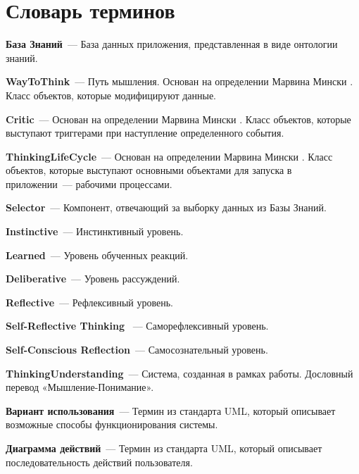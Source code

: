 \chapter*{Словарь терминов} \label{Glossary}            %

\textbf{База Знаний}~--- База данных приложения, представленная в виде онтологии знаний. \par
\textbf{WayToThink}~--- Путь мышления. Основан на определении Марвина Мински \cite{EmotionMachine}. Класс объектов, которые модифицируют данные. \par
\textbf{Critic}~--- Основан на определении Марвина Мински \cite{EmotionMachine}. Класс объектов, которые выступают триггерами при наступление определенного события. \par
\textbf{ThinkingLifeCycle}~--- Основан на определении Марвина Мински \cite{EmotionMachine}. Класс объектов, которые выступают основными объектами для запуска в приложении~--- рабочими процессами. \par
\textbf{Selector}~--- Компонент, отвечающий за выборку данных из Базы Знаний. \par
\textbf{Instinctive}~--- Инстинктивный уровень. \par
\textbf{Learned}~--- Уровень обученных реакций. \par
\textbf{Deliberative}~--- Уровень рассуждений. \par
\textbf{Reflective}~--- Рефлексивный уровень. \par
\textbf{Self-Reflective Thinking	}~--- Саморефлексивный уровень. \par
\textbf{Self-Conscious Reflection}~--- Самосознательный уровень. \par
\textbf{ThinkingUnderstanding}~--- Система, созданная в рамках работы. Дословный перевод «Мышление-Понимание».\par  
\textbf{Вариант использования}~--- Термин из стандарта UML, который описывает возможные способы функционирования системы.\par  
\textbf{Диаграмма действий}~--- Термин из стандарта UML, который описывает последовательность действий пользователя.\par  
 
\clearpage
